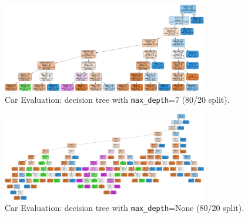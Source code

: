 \begin{figure}[H]
	\centering
	\includegraphics[width=0.8\textwidth]{imgs/dt/dt__car_evaluation__80_vs_20__7.png}
	\caption{Car Evaluation: decision tree with \texttt{max\_depth}=7 (80/20 split).}
	\label{fig:ce-dt-depth-7}
\end{figure}

\begin{figure}[H]
	\centering
	\includegraphics[width=0.8\textwidth]{imgs/dt/dt__car_evaluation__80_vs_20__None.png}
	\caption{Car Evaluation: decision tree with \texttt{max\_depth}=None (80/20 split).}
	\label{fig:ce-dt-depth-none}
\end{figure}
